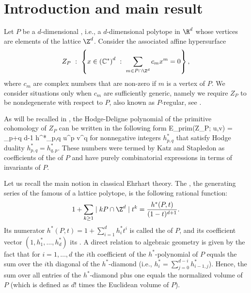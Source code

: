 \documentclass[reqno, 11pt, a4paper, oneside]{amsart}
\begin{document}
\section{Introduction and main result}

Let $P$ be a $d$-dimensional , i.e., a $d$-dimensional polytope in $\R^d$ whose vertices are elements of the lattice $\Z^d$. Consider the associated affine hypersurface
 \[ Z_P ~ : ~ \left\{ x \in \left(\mathbb{C}^* \right)^d ~ : ~ \sum_{m \in P \cap \Z^d}  c_m x^m =0  \right\}, \] 
 where $c_m$ are complex numbers that are non-zero if $m$ is a vertex of $P$.  We consider situations only when $c_m$ are sufficiently generic, namely we require $Z_P$ to be nondegenerate with respect to $P$, also known as $P$-regular, see \cite[Definition 3.3]{batyrev_variations_1993}.
 
As will be recalled in , the Hodge-Deligne polynomial of the primitive cohomology of $Z_P$ can be written in the following form
\be E_{\rm prim}(Z_P; u,v) = \sum_{p+q \le d-1} h^*_{p,q} u^p v^q \label{hodge-diamond}\ee
 for nonnegative integers $h^*_{p,q}$ that satisfy Hodge duality $h^*_{p,q}=h^*_{q,p}$. These numbers were termed by Katz and Stapledon \cite[Remark~7.7]{katz_local_2016} as coefficients of the  of $P$ and have purely combinatorial expressions \cite{danilov_newton_1987, batyrev_mirror_1996, borisov_string_2003, katz_local_2016} in terms of invariants of $P$. 

  Let us recall the main notion in classical Ehrhart theory. The , the generating series of the famous  of a lattice polytope, is the following rational function:
\[1+\sum_{k \geq 1} \mid k  P \cap \Z^d \mid t^k = \frac{h^*(P,t)}{(1-t)^{d+1}}. \] 
Its numerator $ h^*(P,t) = 1+\sum_{i=1}^d h_i^* t^i$ is called the  of $P$, and its coefficient vector $(1,h^*_1, \ldots, h^*_d)$ its . A direct relation to algebraic geometry is given by the fact that for $i=1, \ldots, d$ the $i$th coefficient of the $h^*$-polynomial of $P$ equals the sum over the $i$th diagonal of the $h^*$-diamond (i.e., $h^*_i = \sum_{j=0}^{d-i}h^*_{i-1,j}$). Hence, the sum over all entries of the $h^*$-diamond plus one equals the normalized volume of $P$ (which is defined as $d!$ times the Euclidean volume of $P$).
 
\end{document}
